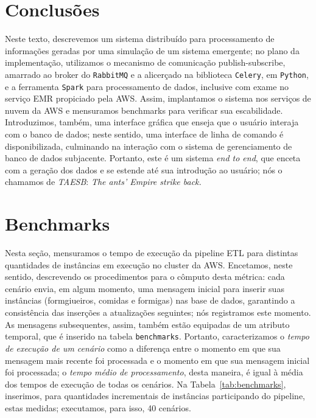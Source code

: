 \documentclass[12pt,oneside,a4paper]{article}
\begin{document}
\section{Conclusões} 

Neste texto, descrevemos um sistema distribuído para processamento de informações geradas por uma simulação de um sistema emergente; no plano da implementação, utilizamos o mecanismo de comunicação publish-subscribe, amarrado ao broker do \texttt{RabbitMQ} e a alicerçado na biblioteca \texttt{Celery}, em \texttt{Python}, e a ferramenta \texttt{Spark} para processamento de dados, inclusive com exame no serviço EMR propiciado pela AWS. Assim, implantamos o sistema nos serviços de nuvem da AWS e mensuramos benchmarks para verificar sua escabilidade. Introduzimos, também, uma interface gráfica que enseja que o usuário interaja com o banco de dados; neste sentido, uma interface de linha de comando é disponibilizada, culminando na interação com o sistema de gerenciamento de banco de dados subjacente. Portanto, este é um sistema \textit{end to end}, que enceta com a geração dos dados e se estende até sua introdução ao usuário; nós o chamamos de \textit{TAESB}: \textit{The ants' Empire strike back.}    

\appendix 

\section{Benchmarks} 

Nesta seção, mensuramos o tempo de execução da pipeline ETL para distintas quantidades de instâncias em execução no cluster da AWS. Encetamos, neste sentido, descrevendo os procedimentos para o cômputo desta métrica: cada cenário envia, em algum momento, uma mensagem inicial para inserir suas instâncias (formgiueiros, comidas e formigas) nas base de dados, garantindo a consistência das inserções a atualizações seguintes; nós registramos este momento. As mensagens subsequentes, assim, também estão equipadas de um atributo temporal, que é inserido na tabela \texttt{benchmarks}. Portanto, caracterizamos o \textit{tempo de execução de um cenário} como a diferença entre o momento em que sua mensagem mais recente foi processada e o momento em que sua mensagem inicial foi processada; o \textit{tempo médio de processamento}, desta maneira, é igual à média dos tempos de execução de todas os cenários. Na Tabela~\ref{tab:benchmarks}, inserimos, para quantidades incrementais de instâncias participando do pipeline, estas medidas; executamos, para isso, 40 cenários.     
\end{document}
